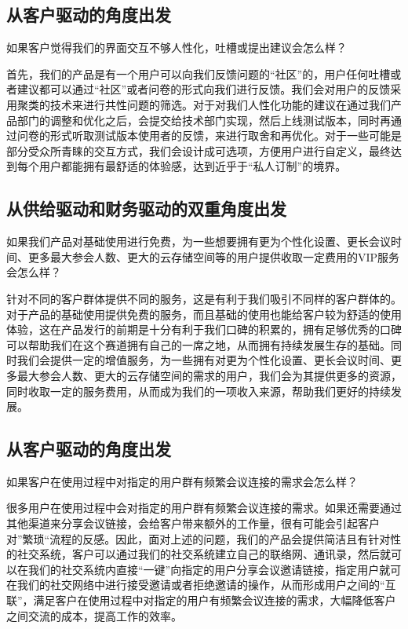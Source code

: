 \documentclass[a4paper,12pt]{article}
\begin{document}
\subsection{从客户驱动的角度出发}
如果客户觉得我们的界面交互不够人性化，吐槽或提出建议会怎么样？

首先，我们的产品是有一个用户可以向我们反馈问题的“社区”的，用户任何吐槽或者建议都可以通过“社区”或者问卷的形式向我们进行反馈。我们会对用户的反馈采用聚类的技术来进行共性问题的筛选。对于对我们人性化功能的建议在通过我们产品部门的调整和优化之后，会提交给技术部门实现，然后上线测试版本，同时再通过问卷的形式听取测试版本使用者的反馈，来进行取舍和再优化。对于一些可能是部分受众所青睐的交互方式，我们会设计成可选项，方便用户进行自定义，最终达到每个用户都能拥有最舒适的体验感，达到近乎于“私人订制”的境界。

\subsection{从供给驱动和财务驱动的双重角度出发}
如果我们产品对基础使用进行免费，为一些想要拥有更为个性化设置、更长会议时间、更多最大参会人数、更大的云存储空间等的用户提供收取一定费用的VIP服务会怎么样？

针对不同的客户群体提供不同的服务，这是有利于我们吸引不同样的客户群体的。对于产品的基础使用提供免费的服务，而且基础的使用也能给客户较为舒适的使用体验，这在产品发行的前期是十分有利于我们口碑的积累的，拥有足够优秀的口碑可以帮助我们在这个赛道拥有自己的一席之地，从而拥有持续发展生存的基础。同时我们会提供一定的增值服务，为一些拥有对更为个性化设置、更长会议时间、更多最大参会人数、更大的云存储空间的需求的用户，我们会为其提供更多的资源，同时收取一定的服务费用，从而成为我们的一项收入来源，帮助我们更好的持续发展。

\subsection{从客户驱动的角度出发}
如果客户在使用过程中对指定的用户群有频繁会议连接的需求会怎么样？

很多用户在使用过程中会对指定的用户群有频繁会议连接的需求。如果还需要通过其他渠道来分享会议链接，会给客户带来额外的工作量，很有可能会引起客户对”繁琐“流程的反感。因此，面对上述的问题，我们的产品会提供简洁且有针对性的社交系统，客户可以通过我们的社交系统建立自己的联络网、通讯录，然后就可以在我们的社交系统内直接“一键”向指定的用户分享会议邀请链接，指定用户就可在我们的社交网络中进行接受邀请或者拒绝邀请的操作，从而形成用户之间的“互联”，满足客户在使用过程中对指定的用户有频繁会议连接的需求，大幅降低客户之间交流的成本，提高工作的效率。
\end{document}
